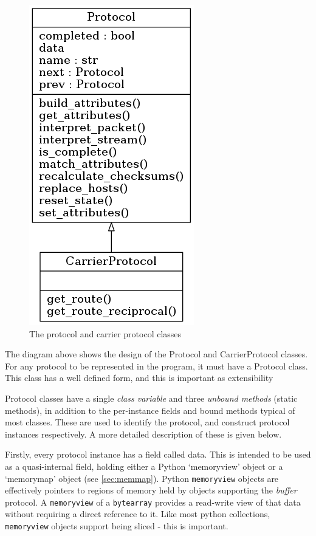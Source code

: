 \documentclass[10pt,a4paper,notitlepage]{report}
\begin{document}
\begin{figure}[H]
\center
\includegraphics[scale=0.7]{diagrams/protocol.png}
\caption{The protocol and carrier protocol classes}
\end{figure}

The diagram above shows the design of the Protocol and CarrierProtocol classes. For any protocol to be represented in the program, it must have a Protocol class. This class has a well defined form, and this is important as extensibility 

Protocol classes have a single \emph{class variable} and three \emph{unbound methods} (static methods), in addition to the per-instance fields and bound methods typical of most classes. These are used to identify the protocol, and construct protocol instances respectively. A more detailed description of these is given below.

Firstly, every protocol instance has a field called data. This is intended to be used as a quasi-internal field, holding either a Python `memoryview' object or a `memorymap' object (see \ref{sec:memmap}). Python \texttt{memoryview} objects are effectively pointers to regions of memory held by objects supporting the \emph{buffer} protocol. A \texttt{memoryview} of a \texttt{bytearray} provides a read-write view of that data without requiring a direct reference to it. Like most python collections, \texttt{memoryview} objects support being sliced - this is important.
\end{document}
